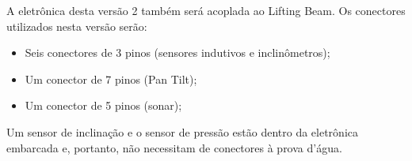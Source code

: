 A eletrônica desta versão 2 também será acoplada ao Lifting Beam. Os
conectores utilizados nesta versão serão:
\begin{itemize}
  \item Seis conectores de 3 pinos (sensores indutivos e inclinômetros);
  \item Um conector de 7 pinos (Pan Tilt);
  \item Um conector de 5 pinos (sonar);
\end{itemize}
Um sensor de inclinação e o sensor de pressão estão dentro da eletrônica
embarcada e, portanto, não necessitam de conectores à prova d'água.